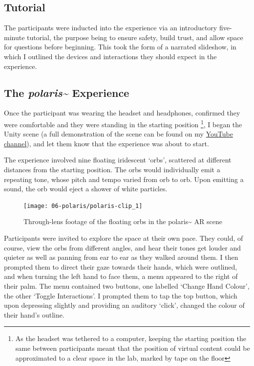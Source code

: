 \subsection{Tutorial}\label{sec: polaris-study-tutorial}
The participants were inducted into the experience via an introductory five-minute tutorial, the purpose being to ensure safety, build trust, and allow space for questions before beginning. This took the form of a narrated slideshow, in which I outlined the devices and interactions they should expect in the experience.

\subsection{The \textit{polaris\textasciitilde{}} Experience}\label{sec: polaris-study-experience}
Once the participant was wearing the headset and headphones, confirmed they were comfortable and they were standing in the starting position \footnote{As the headset was tethered to a computer, keeping the starting position the same between participants meant that the position of virtual content could be approximated to a clear space in the lab, marked by tape on the floor}, I began the Unity scene (a full demonstration of the scene can be found on my \href{https://youtu.be/lCBgMs8ULj0}{YouTube channel}), and let them know that the experience was about to start.

The experience involved nine floating iridescent `orbs', scattered at different distances from the starting position. The orbs would individually emit a repeating tone, whose pitch and tempo varied from orb to orb. Upon emitting a sound, the orb would eject a shower of white particles.

\begin{figure}[ht]
    \centering
    \texttt{[image: 06-polaris/polaris-clip\_1]}
    \captionsetup{justification=centering,margin=1.5cm}
    \caption{Through-lens footage of the floating orbs in the polaris\textasciitilde{} AR scene \citep[from][\href{https://youtu.be/lCBgMs8ULj0?t=19}{at 00:19}]{bilbow2022c}}\label{fig: polaris-clip_1}
\end{figure}

Participants were invited to explore the space at their own pace. They could, of course, view the orbs from different angles, and hear their tones get louder and quieter as well as panning from ear to ear as they walked around them.
I then prompted them to direct their gaze towards their hands, which were outlined, and when turning the left hand to face them, a menu appeared to the right of their palm. The menu contained two buttons, one labelled `Change Hand Colour', the other `Toggle Interactions'. I prompted them to tap the top button, which upon depressing slightly and providing an auditory `click', changed the colour of their hand's outline.

